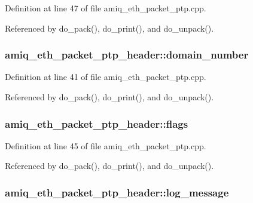 Definition at line 47 of file amiq\_\-eth\_\-packet\_\-ptp.cpp.

Referenced by do\_\-pack(), do\_\-print(), and do\_\-unpack().\hypertarget{classamiq__eth__packet__ptp__header_acd74f33993f8d252846b11407105598a}{
\subsubsection[{domain\_\-number}]{ {\bf amiq\_\-eth\_\-packet\_\-ptp\_\-header::domain\_\-number}}}
\label{classamiq__eth__packet__ptp__header_acd74f33993f8d252846b11407105598a}


Definition at line 41 of file amiq\_\-eth\_\-packet\_\-ptp.cpp.

Referenced by do\_\-pack(), do\_\-print(), and do\_\-unpack().\hypertarget{classamiq__eth__packet__ptp__header_a167d8513bbd0a8c00983dcc29998ebf5}{
\subsubsection[{flags}]{ {\bf amiq\_\-eth\_\-packet\_\-ptp\_\-header::flags}}}
\label{classamiq__eth__packet__ptp__header_a167d8513bbd0a8c00983dcc29998ebf5}


Definition at line 45 of file amiq\_\-eth\_\-packet\_\-ptp.cpp.

Referenced by do\_\-pack(), do\_\-print(), and do\_\-unpack().\hypertarget{classamiq__eth__packet__ptp__header_a0318633469361ac605e5271d83c6b75e}{
\subsubsection[{log\_\-message}]{ {\bf amiq\_\-eth\_\-packet\_\-ptp\_\-header::log\_\-message}}}
\label{classamiq__eth__packet__ptp__header_a0318633469361ac605e5271d83c6b75e}



